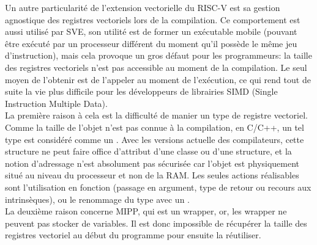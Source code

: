 Un autre particularité de l'extension vectorielle du RISC-V est sa gestion agnostique des registres vectoriels lors de la compilation. Ce comportement est aussi utilisé par SVE, son utilité est de former un exécutable mobile (pouvant être exécuté par un processeur différent du moment qu'il possède le même jeu d'instruction), mais cela provoque un gros défaut pour les programmeurs: la taille des registres vectoriels n'est pas accessible au moment de la compilation. Le seul moyen de l'obtenir est de l'appeler au moment de l'exécution, ce qui rend tout de suite la vie plus difficile pour les développeurs de librairies SIMD (Single Instruction Multiple Data).\\

La première raison à cela est la difficulté de manier un type de registre vectoriel. Comme la taille de l'objet n'est pas connue à la compilation, en C/C++, un tel type est considéré comme un . Avec les versions actuelle des compilateurs, cette structure ne peut faire office d'attribut d'une classe ou d'une structure, et la notion d'adressage n'est absolument pas sécurisée car l'objet est physiquement situé au niveau du processeur et non de la RAM. Les seules actions réalisables sont l'utilisation en fonction (passage en argument, type de retour ou recours aux intrinsèques), ou le renommage du type avec un .\\
   
La deuxième raison concerne MIPP, qui est un wrapper, or, les wrapper ne peuvent pas stocker de variables. Il est donc impossible de récupérer la taille des registres vectoriel au début du programme pour ensuite la réutiliser.\\